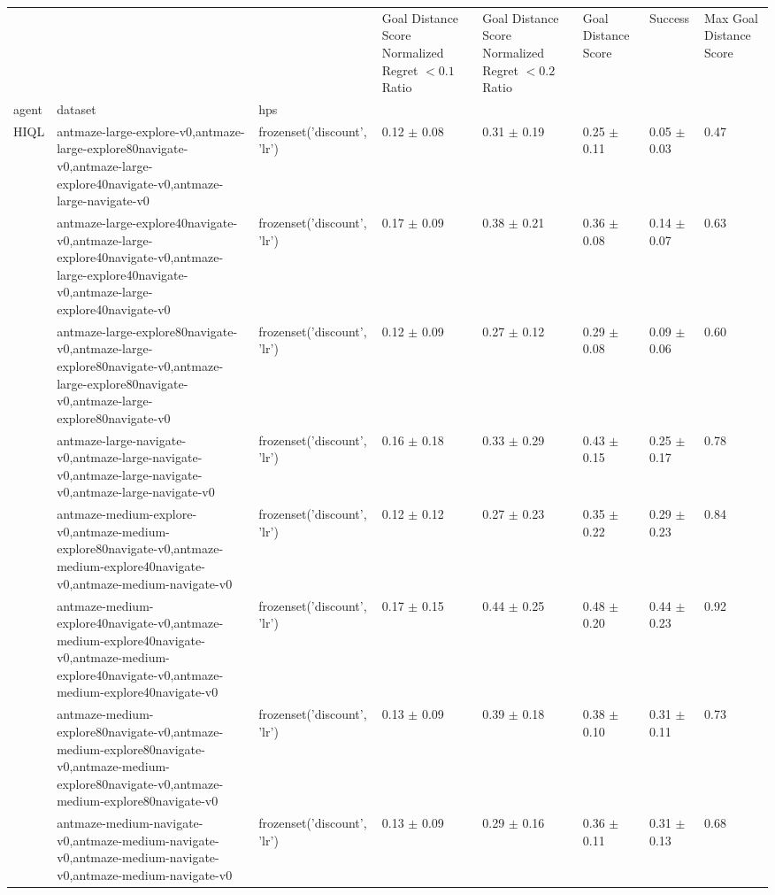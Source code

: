 \begin{tabular}{llllllll}
\toprule
 &  &  & Goal Distance Score Normalized Regret $< 0.1$ Ratio & Goal Distance Score Normalized Regret $< 0.2$ Ratio & Goal Distance Score & Success & Max Goal Distance Score \\
agent & dataset & hps &  &  &  &  &  \\
\midrule
\multirow[t]{8}{*}{HIQL} & antmaze-large-explore-v0,antmaze-large-explore80navigate-v0,antmaze-large-explore40navigate-v0,antmaze-large-navigate-v0 & frozenset({'discount', 'lr'}) & 0.12 $\pm$ 0.08 & 0.31 $\pm$ 0.19 & 0.25 $\pm$ 0.11 & 0.05 $\pm$ 0.03 & 0.47 \\
\cline{2-8}
 & antmaze-large-explore40navigate-v0,antmaze-large-explore40navigate-v0,antmaze-large-explore40navigate-v0,antmaze-large-explore40navigate-v0 & frozenset({'discount', 'lr'}) & 0.17 $\pm$ 0.09 & 0.38 $\pm$ 0.21 & 0.36 $\pm$ 0.08 & 0.14 $\pm$ 0.07 & 0.63 \\
\cline{2-8}
 & antmaze-large-explore80navigate-v0,antmaze-large-explore80navigate-v0,antmaze-large-explore80navigate-v0,antmaze-large-explore80navigate-v0 & frozenset({'discount', 'lr'}) & 0.12 $\pm$ 0.09 & 0.27 $\pm$ 0.12 & 0.29 $\pm$ 0.08 & 0.09 $\pm$ 0.06 & 0.60 \\
\cline{2-8}
 & antmaze-large-navigate-v0,antmaze-large-navigate-v0,antmaze-large-navigate-v0,antmaze-large-navigate-v0 & frozenset({'discount', 'lr'}) & 0.16 $\pm$ 0.18 & 0.33 $\pm$ 0.29 & 0.43 $\pm$ 0.15 & 0.25 $\pm$ 0.17 & 0.78 \\
\cline{2-8}
 & antmaze-medium-explore-v0,antmaze-medium-explore80navigate-v0,antmaze-medium-explore40navigate-v0,antmaze-medium-navigate-v0 & frozenset({'discount', 'lr'}) & 0.12 $\pm$ 0.12 & 0.27 $\pm$ 0.23 & 0.35 $\pm$ 0.22 & 0.29 $\pm$ 0.23 & 0.84 \\
\cline{2-8}
 & antmaze-medium-explore40navigate-v0,antmaze-medium-explore40navigate-v0,antmaze-medium-explore40navigate-v0,antmaze-medium-explore40navigate-v0 & frozenset({'discount', 'lr'}) & 0.17 $\pm$ 0.15 & 0.44 $\pm$ 0.25 & 0.48 $\pm$ 0.20 & 0.44 $\pm$ 0.23 & 0.92 \\
\cline{2-8}
 & antmaze-medium-explore80navigate-v0,antmaze-medium-explore80navigate-v0,antmaze-medium-explore80navigate-v0,antmaze-medium-explore80navigate-v0 & frozenset({'discount', 'lr'}) & 0.13 $\pm$ 0.09 & 0.39 $\pm$ 0.18 & 0.38 $\pm$ 0.10 & 0.31 $\pm$ 0.11 & 0.73 \\
\cline{2-8}
 & antmaze-medium-navigate-v0,antmaze-medium-navigate-v0,antmaze-medium-navigate-v0,antmaze-medium-navigate-v0 & frozenset({'discount', 'lr'}) & 0.13 $\pm$ 0.09 & 0.29 $\pm$ 0.16 & 0.36 $\pm$ 0.11 & 0.31 $\pm$ 0.13 & 0.68 \\

\end{tabular}
